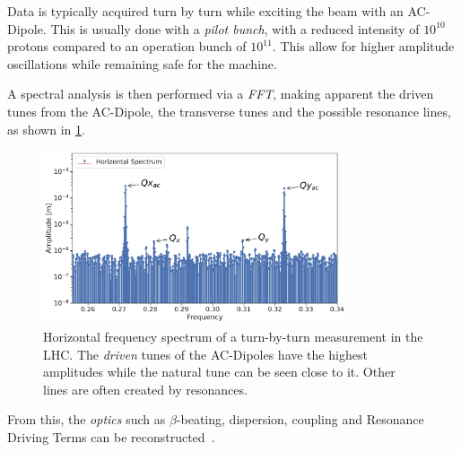 Data is typically acquired turn by turn while exciting the beam with an AC-Dipole. This is usually
done with a \textit{pilot bunch}, with a reduced intensity of $10^{10}$ protons compared to
an operation bunch of $10^{11}$. This allow for higher amplitude oscillations while remaining safe 
for the machine.

A spectral analysis is then performed via a \textit{FFT}, making apparent the driven tunes from the 
AC-Dipole, the transverse tunes and the possible resonance lines, as shown in
\cref{fig:optics_measurements:tbt_data:spectrum}.

\begin{figure}[H]
    \centering
    \includegraphics[width=0.8\textwidth]{./images/basic_spectrum.pdf}
    \caption{Horizontal frequency spectrum of a turn-by-turn measurement in the LHC. The 
    \textit{driven} tunes of the AC-Dipoles have the highest amplitudes while the natural tune can
    be seen close to it. Other lines are often created by resonances.}
    \label{fig:optics_measurements:tbt_data:spectrum}
\end{figure}

From this, the \textit{optics} such as $\beta$-beating, dispersion, coupling and Resonance Driving
Terms can be reconstructed~\cite{catalan-lasheras_linear_2004}.



\subsection{}
\label{subsection:optics_corrections_chromaticity}

\subsubsection{}

